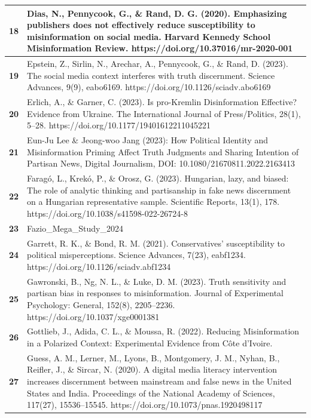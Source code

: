 \documentclass[
  doc,floatsintext]{apa6}
\begin{document}
\begin{longtable}[t]{>{}r||>{\raggedright\arraybackslash}p{30em}}
\hline
\textbf{18} & Dias, N., Pennycook, G., \& Rand, D. G. (2020). Emphasizing publishers does not effectively reduce susceptibility to misinformation on social media. Harvard Kennedy School Misinformation Review. https://doi.org/10.37016/mr-2020-001\\
\hline
\textbf{19} & Epstein, Z., Sirlin, N., Arechar, A., Pennycook, G., \& Rand, D. (2023). The social media context interferes with truth discernment. Science Advances, 9(9), eabo6169. https://doi.org/10.1126/sciadv.abo6169\\
\hline
\textbf{20} & Erlich, A., \& Garner, C. (2023). Is pro-Kremlin Disinformation Effective? Evidence from Ukraine. The International Journal of Press/Politics, 28(1), 5–28. https://doi.org/10.1177/19401612211045221\\
\hline
\textbf{21} & Eun-Ju Lee \& Jeong-woo Jang (2023): How Political Identity and Misinformation Priming Affect Truth Judgments and Sharing Intention of Partisan News, Digital Journalism, DOI: 10.1080/21670811.2022.2163413\\
\hline
\textbf{22} & Faragó, L., Krekó, P., \& Orosz, G. (2023). Hungarian, lazy, and biased: The role of analytic thinking and partisanship in fake news discernment on a Hungarian representative sample. Scientific Reports, 13(1), 178. https://doi.org/10.1038/s41598-022-26724-8\\
\hline
\textbf{23} & Fazio\_Mega\_Study\_2024\\
\hline
\textbf{24} & Garrett, R. K., \& Bond, R. M. (2021). Conservatives’ susceptibility to political misperceptions. Science Advances, 7(23), eabf1234. https://doi.org/10.1126/sciadv.abf1234\\
\hline
\textbf{25} & Gawronski, B., Ng, N. L., \& Luke, D. M. (2023). Truth sensitivity and partisan bias in responses to misinformation. Journal of Experimental Psychology: General, 152(8), 2205–2236. https://doi.org/10.1037/xge0001381\\
\hline
\textbf{26} & Gottlieb, J., Adida, C. L., \& Moussa, R. (2022). Reducing Misinformation in a Polarized Context: Experimental Evidence from Côte d’Ivoire.\\
\hline
\textbf{27} & Guess, A. M., Lerner, M., Lyons, B., Montgomery, J. M., Nyhan, B., Reifler, J., \& Sircar, N. (2020). A digital media literacy intervention increases discernment between mainstream and false news in the United States and India. Proceedings of the National Academy of Sciences, 117(27), 15536–15545. https://doi.org/10.1073/pnas.1920498117\\

\end{longtable}
\end{document}
